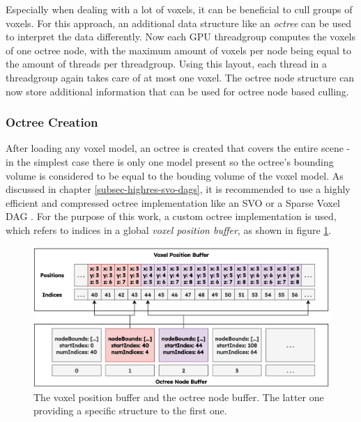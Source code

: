 \noindent
Especially when dealing with a lot of voxels, it can be beneficial to cull groups of voxels. For this approach, an 
additional data structure like an \emph{octree} can be used to interpret the data differently. Now each \ac{GPU} 
threadgroup computes the voxels of one octree node, with the maximum amount of voxels per node being equal to the 
amount of threads per threadgroup. Using this layout, each thread in a threadgroup again takes care of at most one 
voxel. The octree node structure can now store additional information that can be used for octree node based 
culling.

\subsubsection*{Octree Creation} \label{subsec-octree-creation}

After loading any voxel model, an octree is created that covers the entire scene - in the simplest case there is 
only one model present so the octree's bounding volume is considered to be equal to the bouding volume of the voxel 
model. As discussed in chapter \ref{subsec-highres-svo-dags}, it is recommended to use a highly efficient and 
compressed octree implementation like an \ac{SVO} or a Sparse Voxel \ac{DAG} \cite{Kampe2013}. For the purpose of 
this work, a custom octree implementation is used, which refers to indices in a global \emph{voxel position buffer}, 
as shown in figure \ref{fig:voxelpos-octreenode-buffer}.\\

\begin{figure}[h]
    \centering
    \includegraphics[width=\linewidth]{images/graphics/voxelpos-octreenode-buffer.jpg}
    \caption{The voxel position buffer and the octree node buffer. The latter one providing a 
    specific structure to the first one.}
    \label{fig:voxelpos-octreenode-buffer}
\end{figure}

